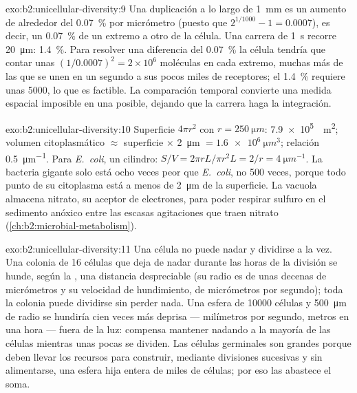 \begin{solution}{exo:b2:unicellular-diversity:9}
Una duplicación a lo largo de \qty{1}{mm} es un aumento de alrededor del
\qty{0.07}{\%} por micrómetro (puesto que $2^{1/1000} - 1 = 0.0007$), es
decir, un \qty{0.07}{\%} de un extremo a otro de la célula. Una carrera de
\qty{1}{s} recorre \qty{20}{\micro m}: \qty{1.4}{\%}. Para resolver una
diferencia del \qty{0.07}{\%} la célula tendría que contar unas
$(1/0.0007)^2 = 2\times 10^6$ moléculas en cada extremo, muchas más de
las que se unen en un segundo a sus pocos miles de receptores; el
\qty{1.4}{\%} requiere unas \num{5000}, lo que es factible. La
comparación temporal convierte una medida espacial imposible en una
posible, dejando que la carrera haga la integración.
\end{solution}

\begin{solution}{exo:b2:unicellular-diversity:10}
Superficie $4\pi r^2$ con $r = \qty{250}{\micro m}$: \qty{7.9e5}{\micro
m^2}; volumen citoplasmático $\approx$ superficie $\times$ \qty{2}{\micro m}
$= \qty{1.6e6}{\micro m^3}$; relación \qty{0.5}{\micro m^{-1}}. Para
\emph{E.~coli}, un cilindro: $S/V = 2\pi r L/\pi r^2 L = 2/r =
\qty{4}{\micro m^{-1}}$. La bacteria gigante solo está ocho veces peor
que \emph{E.~coli}, no 500 veces, porque todo punto de su citoplasma
está a menos de \qty{2}{\micro m} de la superficie. La vacuola almacena
nitrato, su aceptor de electrones, para poder respirar sulfuro en el
sedimento anóxico entre las escasas agitaciones que traen nitrato
(\cref{ch:b2:microbial-metabolism}).
\end{solution}

\begin{solution}{exo:b2:unicellular-diversity:11}
Una célula no puede nadar y dividirse a la vez. Una colonia de 16
células que deja de nadar durante las horas de la división se hunde,
según la , una distancia despreciable (su radio es de unas
decenas de micrómetros y su velocidad de hundimiento, de micrómetros por
segundo); toda la colonia puede dividirse sin perder nada. Una esfera de
\num{10000} células y \qty{500}{\micro m} de radio se hundiría cien
veces más deprisa --- milímetros por segundo, metros en una hora ---
fuera de la luz: compensa mantener nadando a la mayoría de las células
mientras unas pocas se dividen. Las células germinales son grandes
porque deben llevar los recursos para construir, mediante divisiones
sucesivas y sin alimentarse, una esfera hija entera de miles de células;
por eso las abastece el soma.
\end{solution}

